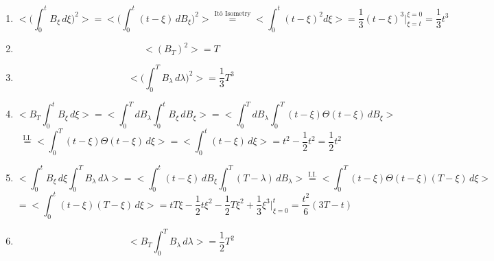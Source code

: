 \documentclass{article}
\numberwithin{equation}{section}
\begin{document}
    \begin{enumerate}

    \item
    \begin{center}
        $$
            \bigg<\bigg(\int_0^tB_{\xi}\,d\xi\bigg)^2\bigg> = \bigg<\bigg(\int_0^t(t-\xi)\,dB_{\xi}\bigg)^2\bigg> \overset{\text{Itô Isometry}}{=} \bigg<\int_0^t(t-\xi)^2d\xi\bigg> = \frac{1}{3}(t-\xi)^3\bigg|^{\xi=0}_{\xi=t} = \boxed{\frac{1}{3}t^3}
        $$
    \end{center}

    \vspace{0.2in}

    \item
    \begin{center}
        $$
            \big<(B_T)^2\big> = \boxed{T}
        $$
    \end{center}

    \vspace{0.2in}

    \item
    \begin{center}
        $$
            \bigg<\bigg(\int_0^TB_{\lambda}\,d\lambda\bigg)^2\bigg> = \boxed{\frac{1}{3}T^3}
        $$
    \end{center}

    \vspace{0.2in}

    \item
    \begin{center}
        $$
            \bigg<B_T\int_0^tB_{\xi}\,d\xi\bigg> = \bigg<\int_0^TdB_{\lambda}\int_0^tB_{\xi}\,dB_{\xi}\bigg> = \bigg<\int_0^TdB_{\lambda}\int_0^T(t-\xi)\Theta(t-\xi)\,dB_{\xi}\bigg>
        $$
        $$
            \overset{\text{I.I.}}{=} \bigg<\int_0^T(t-\xi)\Theta(t-\xi)\,d\xi\bigg> = \bigg<\int_0^t(t-\xi)\,d\xi\bigg> = t^2-\frac{1}{2}t^2 = \boxed{\frac{1}{2}t^2}
        $$
    \end{center}

    \vspace{0.2in}

    \item
    \begin{center}
        $$
            \bigg<\int_0^tB_{\xi}\,d\xi\int_0^TB_{\lambda}\,d\lambda\bigg> = \bigg<\int_0^t(t-\xi)\,dB_{\xi}\int_0^T(T-\lambda)\,dB_{\lambda}\bigg> \overset{\text{I.I.}}{=} \bigg<\int_0^T(t-\xi)\Theta(t-\xi)(T-\xi)\,d\xi\bigg>
        $$
        $$
            =\bigg<\int_0^t(t-\xi)(T-\xi)\,d\xi\bigg> = tT\xi-\frac{1}{2}t\xi^2-\frac{1}{2}T\xi^2 + \frac{1}{3}\xi^3\bigg|_{\xi=0}^t = \boxed{\frac{t^2}{6}(3T-t)}
        $$
    \end{center}

    \vspace{0.2in}

    \item
    \begin{center}
        $$
            \bigg<B_T\int_0^TB_{\lambda}\,d\lambda\bigg> = \boxed{\frac{1}{2}T^2}
        $$
    \end{center}
    \end{enumerate}
\end{document}

